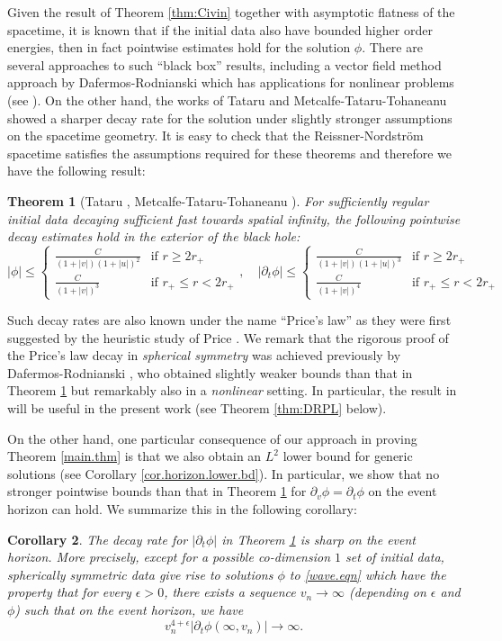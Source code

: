 \documentclass[12 pt, reqno]{amsart}
\newtheorem{theorem}{Theorem}[section]
\newtheorem{corollary}[theorem]{Corollary}
\theoremstyle{definition}
\theoremstyle{remark}
\numberwithin{equation}{section}
\newcommand{\ep}{\epsilon}
\newcommand{\rd}{\partial}
\newcommand{\0}{\emptyset}
\newcommand{\f}{\frac}
\begin{document}
Given the result of Theorem \ref{thm:Civin} together with asymptotic flatness of the spacetime, it is known that if the initial data also have bounded higher order energies, then in fact pointwise estimates hold for the solution $\phi$. There are several approaches to such ``black box'' results, including a vector field method approach by Dafermos-Rodnianski \cite{DRNM} which has applications for nonlinear problems (see \cite{Yang}). On the other hand, the works of Tataru \cite{Ta} and Metcalfe-Tataru-Tohaneanu \cite{MTT} showed a sharper decay rate for the solution under slightly stronger assumptions on the spacetime geometry. It is easy to check that the Reissner-Nordstr\"om spacetime satisfies the assumptions required for these theorems and therefore we have the following result:
\begin{theorem}[Tataru \cite{Ta}, Metcalfe-Tataru-Tohaneanu \cite{MTT}] \label{linear.Price.law}
For sufficiently regular initial data decaying sufficient fast towards spatial infinity, the following pointwise decay estimates hold in the exterior of the black hole:
$$|\phi|\leq \begin{cases}\f{C}{(1+|v|)(1+|u|)^2} & \mbox{if } r\geq 2r_+\\ \f{C}{(1+|v|)^3} & \mbox{if } r_+\leq r< 2r_+  \end{cases},\quad |\rd_t\phi|\leq \begin{cases}\f{C}{(1+|v|)(1+|u|)^3} & \mbox{if } r\geq 2r_+\\ \f{C}{(1+|v|)^4} & \mbox{if } r_+\leq r< 2r_+  \end{cases}$$
\end{theorem}
Such decay rates are also known under the name ``Price's law'' as they were first suggested by the heuristic study of Price \cite{Price}. We remark that the rigorous proof of the Price's law decay in \emph{spherical symmetry} was achieved previously by Dafermos-Rodnianski \cite{DRPL}, who obtained slightly weaker bounds than that in Theorem \ref{linear.Price.law} but remarkably also in a \emph{nonlinear} setting. In particular, the result in \cite{DRPL} will be useful in the present work (see Theorem \ref{thm:DRPL} below).

On the other hand, one particular consequence of our approach in proving Theorem \ref{main.thm} is that we also obtain an $L^2$ lower bound for generic solutions (see Corollary \ref{cor.horizon.lower.bd}). In particular, we show that no stronger pointwise bounds than that in Theorem \ref{linear.Price.law} for $\rd_v\phi=\rd_t\phi$ on the event horizon can hold. We summarize this in the following corollary:
\begin{corollary}\label{linear.Price.law.sharp}
The decay rate for $|\rd_t\phi|$ in Theorem \ref{linear.Price.law} is sharp on the event horizon. More precisely, except for a possible co-dimension $1$ set of initial data, spherically symmetric data give rise to solutions $\phi$ to \eqref{wave.eqn} which have the property that for every $\ep>0$, there exists a sequence $v_n\to \infty$ (depending on $\ep$ and $\phi$) such that on the event horizon, we have
$$v_n^{4+\ep}|\rd_t\phi(\infty,v_n)|\to \infty.$$
\end{corollary}
\end{document}
